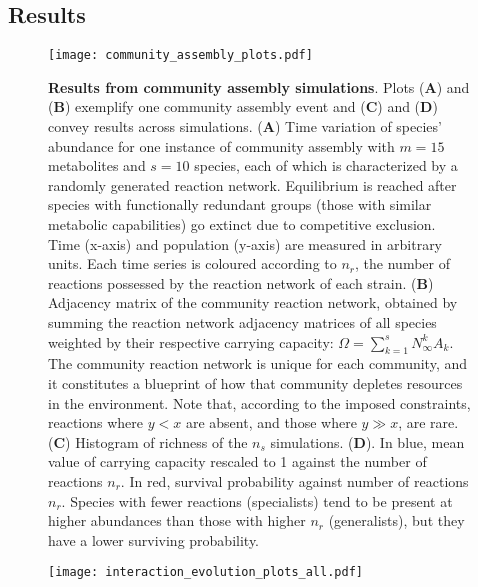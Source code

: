 \documentclass[titlepage,11pt]{article}
\begin{document}
\begin{linenumbers}
		\section{Results}
			\begin{figure}
				\centering			
				\texttt{[image: community\_assembly\_plots.pdf]}
				\caption{\textbf{Results from community assembly simulations}. Plots (\textbf{A}) and (\textbf{B}) exemplify one community assembly event and  (\textbf{C}) and (\textbf{D}) convey results across simulations. (\textbf{A}) Time variation of species' abundance for one instance of community assembly with $ m = 15 $ metabolites and $ s = 10 $ species, each of which is characterized by a randomly generated reaction network. Equilibrium is reached after species with functionally redundant groups (those with similar metabolic capabilities) go extinct due to competitive exclusion. Time (x-axis) and population (y-axis) are measured in arbitrary units. Each time series is coloured according to $ n_r $, the number of reactions possessed by the reaction network of each strain. (\textbf{B}) Adjacency matrix of the community reaction network, obtained by summing the reaction network adjacency matrices of all species weighted by their respective carrying capacity: $ \Omega = \sum_{k = 1}^{s} N^k_{\infty}A_k  $. The community reaction network is unique for each community, and it constitutes a blueprint of how that community depletes resources in the environment. Note that, according to the imposed constraints, reactions where $ y < x $ are absent, and those where $ y \gg  x $, are rare. (\textbf{C}) Histogram of richness of the $ n_s $ simulations. (\textbf{D}). In blue, mean value of carrying capacity rescaled to 1 against the number of reactions $ n_r $. In red, survival probability against number of reactions $ n_r $. Species with fewer reactions (specialists) tend to be present at higher abundances than those with higher $ n_r $ (generalists), but they have a lower surviving probability.}
				\label{fig:community_assembly_results}
			\end{figure}
			\begin{figure}
			\centering			
			\texttt{[image: interaction\_evolution\_plots\_all.pdf]}

\end{figure}
\end{linenumbers}
\end{document}
